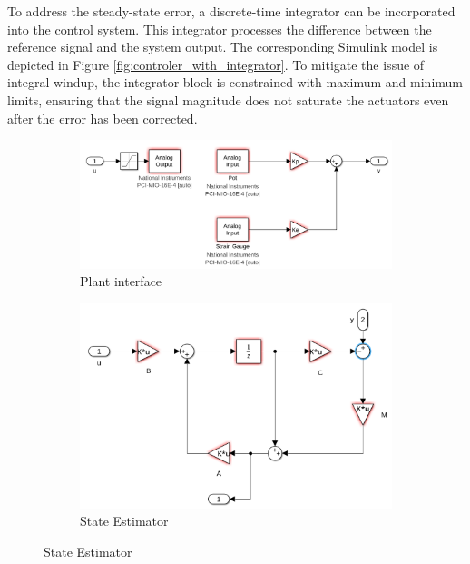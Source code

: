 To address the steady-state error, a discrete-time integrator can be incorporated into the control system. This integrator processes the difference between the reference signal and the system output. The corresponding Simulink model is depicted in Figure \ref{fig:controler_with_integrator}. To mitigate the issue of integral windup, the integrator block is constrained with maximum and minimum limits, ensuring that the signal magnitude does not saturate the actuators even after the error has been corrected.
\begin{figure}[H]
    \centering
    \begin{subfigure}{0.47\textwidth}
        \includegraphics[width=\textwidth]{Figs/Simulink Models/Plant Interface.png}
        \caption{Plant interface}
        \label{fig:plant_interface}
    \end{subfigure}
    \hfill
    \begin{subfigure}{0.37\textwidth}
        \includegraphics[width=\textwidth]{Figs/Simulink Models/State_Estimator.png}
        \caption{State Estimator}
        \label{fig:state_estimator}
    \end{subfigure}


\end{figure}
